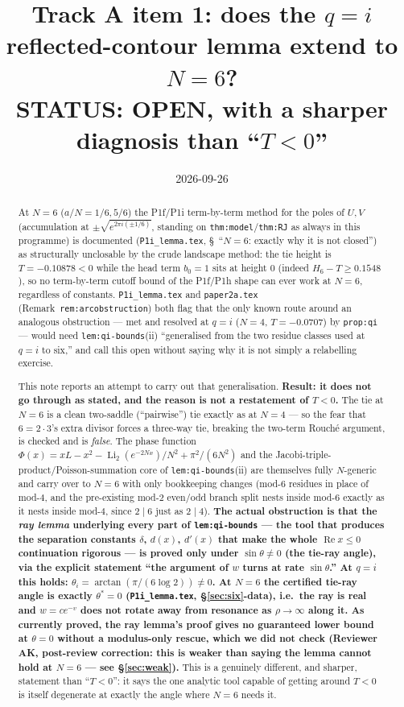 \documentclass[11pt]{article}
\title{Track A item 1: does the $q=i$ reflected-contour lemma extend to $N=6$?\\
\large STATUS: OPEN, with a sharper diagnosis than ``$T<0$''}
\author{}
\date{2026-09-26}
\theoremstyle{plain}
\theoremstyle{remark}
\newcommand{\e}[1]{e^{2\pi i #1}}
\newcommand{\Li}{\operatorname{Li}_2}
\begin{document}
\maketitle

\begin{abstract}
At $N=6$ ($a/N=1/6,5/6$) the P1f/P1i term-by-term method for the poles of $U,V$ (accumulation at
$\pm\sqrt{\e{(\pm1/6)}}$, standing on \texttt{thm:model}/\texttt{thm:RJ} as always in this programme) is
documented (\texttt{P1i\_lemma.tex}, \S~``$N=6$: exactly why it is not closed'') as structurally
unclosable by the crude landscape method: the tie height is $T=-0.10878<0$ while the head term $b_0=1$
sits at height $0$ (indeed $H_6-T\ge0.1548$), so no term-by-term cutoff bound of the P1f/P1h shape can
ever work at $N=6$, regardless of constants. \texttt{P1i\_lemma.tex} and \texttt{paper2a.tex}
(Remark~\texttt{rem:arcobstruction}) both flag that the only known route around an analogous obstruction
--- met and resolved at $q=i$ ($N=4$, $T=-0.0707$) by \texttt{prop:qi} --- would need
\texttt{lem:qi-bounds}(ii) ``generalised from the two residue classes used at $q=i$ to six,'' and call
this open without saying why it is not simply a relabelling exercise.

This note reports an attempt to carry out that generalisation. \textbf{Result: it does not go through as
stated, and the reason is not a restatement of $T<0$.} The tie at $N=6$ is a clean two-saddle
(``pairwise'') tie exactly as at $N=4$ --- so the fear that $6=2\cdot3$'s extra divisor forces a
three-way tie, breaking the two-term Rouch\'e argument, is checked and is \emph{false}. The phase function
$\Phi(x)=xL-x^2-\Li(e^{-2Nx})/N^2+\pi^2/(6N^2)$ and the Jacobi-triple-product/Poisson-summation core of
\texttt{lem:qi-bounds}(ii) are themselves fully $N$-generic and carry over to $N=6$ with only bookkeeping
changes (mod-$6$ residues in place of mod-$4$, and the pre-existing mod-$2$ even/odd branch split nests
inside mod-$6$ exactly as it nests inside mod-$4$, since $2\mid6$ just as $2\mid4$). \textbf{The actual
obstruction is that the \emph{ray lemma} underlying every part of \texttt{lem:qi-bounds} --- the tool that
produces the separation constants $\delta$, $d(x)$, $d'(x)$ that make the whole $\operatorname{Re}x\le0$
continuation rigorous --- is proved only under $\sin\theta\ne0$ (the tie-ray angle), via the explicit
statement ``the argument of $w$ turns at rate $\sin\theta$.'' At $q=i$ this holds:
$\theta_i=\arctan(\pi/(6\log2))\ne0$. At $N=6$ the certified tie-ray angle is exactly $\theta^*=0$
(\texttt{P1i\_lemma.tex}, \S\ref{sec:six}-data), i.e.\ the ray is real and $w=ce^{-v}$ does not rotate away
from resonance as $\rho\to\infty$ along it. As currently proved, the ray lemma's proof gives no
guaranteed lower bound at $\theta=0$ without a modulus-only rescue, which we did not check (Reviewer
AK, post-review correction: this is weaker than saying the lemma cannot hold at $N=6$ --- see
\S\ref{sec:weak}).} This is a genuinely different, and sharper, statement than ``$T<0$'': it says the
one analytic tool capable of getting around $T<0$ is itself degenerate at exactly the angle where $N=6$
needs it.
\end{abstract}
\end{document}
